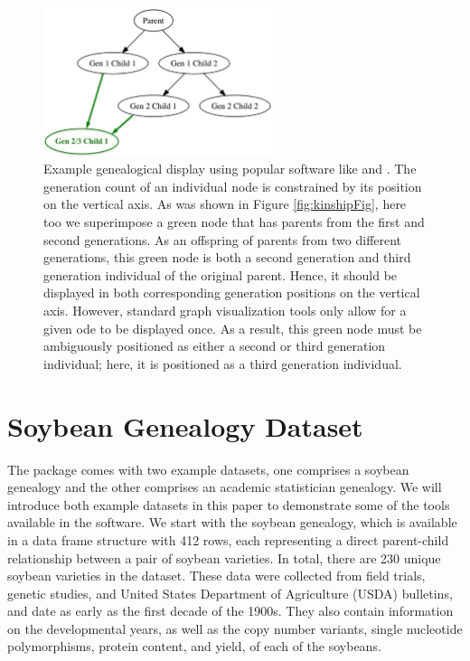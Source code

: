 \documentclass[article,shortnames]{jss}
\begin{document}
\begin{figure}[h]
    \centering
    \includegraphics[width=0.6\textwidth]{Graph}
    \caption{Example genealogical display using popular software like  and . The generation count of an individual node is constrained by its position on the vertical axis. As was shown in Figure \ref{fig:kinshipFig}, here too we superimpose a green node that has parents from the first and second generations. As an offspring of parents from two different generations, this green node is both a second generation and third generation individual of the original parent. Hence, it should be displayed in both corresponding generation positions on the vertical axis. However, standard graph visualization tools only allow for a given ode to be displayed once. As a result, this green node must be ambiguously positioned as either a second or third generation individual; here, it is positioned as a third generation individual.}
    \label{fig:Graph}
\end{figure}

\section{Soybean Genealogy Dataset}

The  package comes with two example datasets, one comprises a soybean genealogy and the other comprises an academic statistician genealogy. We will introduce both example datasets in this paper to demonstrate some of the tools available in the software. We start with the soybean genealogy, which is available in a data frame structure with 412 rows, each representing a direct parent-child relationship between a pair of soybean varieties. In total, there are 230 unique soybean varieties in the dataset. These data were collected from field trials, genetic studies, and United States Department of Agriculture (USDA) bulletins, and date as early as the first decade of the 1900s. They also contain information on the developmental years, as well as the copy number variants, single nucleotide polymorphisms, protein content, and yield, of each of the soybeans.
\end{document}
